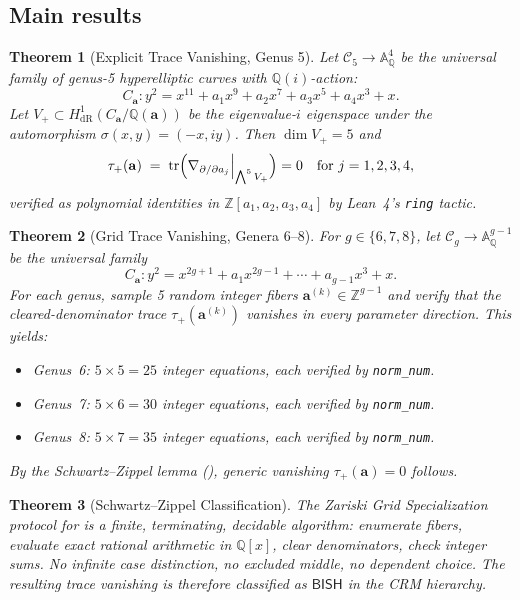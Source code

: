 \documentclass[11pt]{article}
\theoremstyle{plain}
\newtheorem{theorem}{Theorem}[section]
\theoremstyle{definition}
\theoremstyle{remark}
\newcommand{\ZZ}{\mathbb{Z}}
\newcommand{\QQ}{\mathbb{Q}}
\newcommand{\Aff}{\mathbb{A}}
\newcommand{\cC}{\mathcal{C}}
\newcommand{\tr}{\mathrm{tr}}
\newcommand{\BISH}{\mathsf{BISH}}
\begin{document}
\subsection{Main results}

\begin{theorem}[Explicit Trace Vanishing, Genus 5]\label{thm:A}
Let $\cC_5 \to \Aff^4_\QQ$ be the universal family of genus-5 hyperelliptic
curves with $\QQ(i)$-action:
\[
  C_{\mathbf{a}}: y^2 = x^{11} + a_1 x^9 + a_2 x^7 + a_3 x^5 + a_4 x^3 + x.
\]
Let $V_+ \subset H^1_{\mathrm{dR}}(C_{\mathbf{a}}/\QQ(\mathbf{a}))$ be the
eigenvalue-$i$ eigenspace under the automorphism $\sigma(x,y) = (-x,iy)$.
Then $\dim V_+ = 5$ and
\[
  \tau_+(\mathbf{a}) \;=\; \tr\Bigl(\nabla_{\partial/\partial a_j}\Big|_{\bigwedge^5 V_+}\Bigr) = 0
  \quad \text{for } j = 1, 2, 3, 4,
\]
verified as polynomial identities in $\ZZ[a_1, a_2, a_3, a_4]$ by Lean~4's
\texttt{ring} tactic.
\end{theorem}

\begin{theorem}[Grid Trace Vanishing, Genera 6--8]\label{thm:B}
For $g \in \{6,7,8\}$, let $\cC_g \to \Aff^{g-1}_\QQ$ be the universal family
\[
  C_{\mathbf{a}}: y^2 = x^{2g+1} + a_1 x^{2g-1} + \cdots + a_{g-1} x^3 + x.
\]
For each genus, sample 5 random integer fibers $\mathbf{a}^{(k)} \in \ZZ^{g-1}$
and verify that the cleared-denominator trace $\tau_+(\mathbf{a}^{(k)})$ vanishes
in every parameter direction.  This yields:
\begin{itemize}[nosep]
  \item Genus~6: $5 \times 5 = 25$ integer equations, each verified by \texttt{norm\_num}.
  \item Genus~7: $5 \times 6 = 30$ integer equations, each verified by \texttt{norm\_num}.
  \item Genus~8: $5 \times 7 = 35$ integer equations, each verified by \texttt{norm\_num}.
\end{itemize}
By the Schwartz--Zippel lemma (), generic vanishing
$\tau_+(\mathbf{a}) = 0$ follows.
\end{theorem}

\begin{theorem}[Schwartz--Zippel Classification]\label{thm:C}
The Zariski Grid Specialization protocol for  is a finite,
terminating, decidable algorithm: enumerate fibers, evaluate exact rational
arithmetic in $\QQ[x]$, clear denominators, check integer sums.
No infinite case distinction, no excluded middle, no dependent choice.
The resulting trace vanishing is therefore classified as $\BISH$ in the
CRM hierarchy.
\end{theorem}
\end{document}
